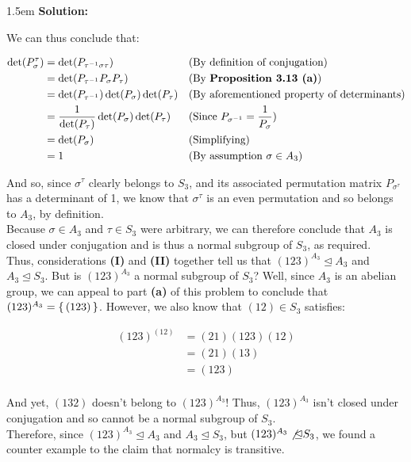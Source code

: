 \documentclass{article}
\newenvironment{solution}{
	\vspace{.5em}
	\par
	\begin{adjustwidth}{1.5em}{}
	\textbf{{Solution:}}
	\par
	\vspace{.5em}
}{
	\vspace{1em}
	\end{adjustwidth}
	\setcounter{step}{0}
}
\newcounter{step}
\newcounter{problem}
\begin{document}
\begin{solution}
	We can thus conclude that:

	\begin{align*}
		\det(P_{\sigma}^{\tau}) &= \det(P_{\tau^{-1}\sigma\tau}) &&\text{(By definition of conjugation)} \\
		&= \det(P_{\tau^{-1}}P_{\sigma}P_{\tau}) &&\text{(By \textbf{Proposition 3.13 (a)})} \\
		&= \det(P_{\tau^{-1}})\det(P_{\sigma})\det(P_{\tau}) &&\text{(By aforementioned property of determinants)} \\
		&= \frac{1}{\det(P_{\tau})}\det(P_{\sigma})\det(P_{\tau}) &&\text{(Since $P_{\sigma^{-1}} = \frac{1}{P_{\sigma}}$)} \\
		&= \det(P_{\sigma}) &&\text{(Simplifying)} \\
		&= 1 &&\text{(By assumption $\sigma \in A_{3}$)} \\
	\end{align*}

	And so, since $\sigma^{\tau}$ clearly belongs to $S_{3}$, and its associated permutation matrix $P_{\sigma^{\tau}}$ has a determinant of 1, we know that $\sigma^{\tau}$ is an even permutation and so belongs to $A_{3}$, by definition. \\

	Because $\sigma \in A_{3}$ and $\tau \in S_{3}$ were arbitrary, we can therefore conclude that $A_{3}$ is closed under conjugation and is thus a normal subgroup of $S_{3}$, as required. \\

	Thus, considerations \textbf{(I)} and \textbf{(II)} together tell us that $(123)^{A_{3}} \unlhd A_{3}$ and $A_{3} \unlhd S_{3}$. But is $(123)^{A_{3}}$ a normal subgroup of $S_{3}$? Well, since $A_{3}$ is an abelian group, we can appeal to part \textbf{(a)} of this problem to conclude that $(123)^{A_{3}} = \set{(123)}$. However, we also know that $(12) \in S_{3}$ satisfies:

	\begin{align*}
		(123)^{(12)} &= (21)(123)(12) \\
		&= (21)(13) \\
		&= (123) \\
	\end{align*}

	And yet, $(132)$ doesn't belong to $(123)^{A_{3}}$! Thus, $(123)^{A_{3}}$ isn't closed under conjugation and so cannot be a normal subgroup of $S_{3}$. \\

	Therefore, since $(123)^{A_{3}} \unlhd A_{3}$ and $A_{3} \unlhd S_{3}$, but $(123)^{A_{3}} \not\unlhd S_{3}$, we found a counter example to the claim that normalcy is transitive.
\end{solution}
\end{document}
